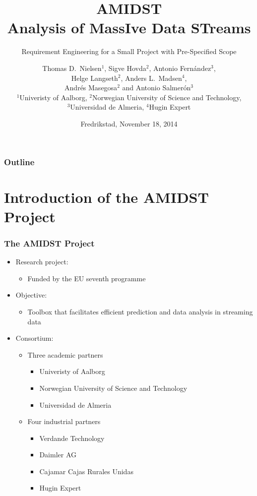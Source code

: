 \documentclass{beamer}
\title{AMIDST \\ \Large \textcolor{orange!60}{Analysis} 
				   \textcolor{blue!50!cyan!80}{of MassIve} 
				   \textcolor{olive!5!green!90}{Data STreams}}
\subtitle{Requirement Engineering for a Small Project with Pre-Specified Scope}
\author{{\scriptsize Thomas D.\ Nielsen$^{1}$, Sigve Hovda$^{2}$, Antonio Fern\'andez$^{3}$, \\ Helge Langseth$^{2}$, 
Anders L.\ Madsen$^{4}$, \\Andr\'es Masegosa$^{2}$ and  Antonio Salmer\'on$^{3}$ \\
 $^{1}$Univeristy of Aalborg, $^{2}$Norwegian University of Science and Technology, 
\\
 $^{3}$Universidad de Almeria, $^{4}$Hugin Expert}}
\date{Fredrikstad, November 18, 2014}
\begin{document}
\begin{frame}\frametitle{}
\titlepage
\end{frame}

\begin{frame}\frametitle{Outline}
\vspace{-1cm}
\tableofcontents
\end{frame}

\section{Introduction of the AMIDST Project}


\begin{frame} \frametitle{The AMIDST Project} 
\vspace{-1cm}

\begin{itemize}
\item<1-> Research project:
\begin{itemize}
\item<1-> Funded by the EU seventh programme
\end{itemize}
\item<2-> Objective: 
\begin{itemize}
\item<2-> Toolbox that facilitates efficient prediction and data analysis in streaming data
\end{itemize}
\item<3-> Consortium:
\begin{itemize}
\item<3-> Three academic partners
\begin{itemize}
\item<3-> Univeristy of Aalborg
\item<3-> Norwegian University of Science and Technology
\item<3-> Universidad de Almeria
\end{itemize}
\item<4-> Four industrial partners
\begin{itemize}
\item<4-> Verdande Technology
\item<4-> Daimler AG
\item<4-> Cajamar Cajas Rurales Unidas
\item<4-> Hugin Expert
\end{itemize}
\end{itemize}
\end{itemize}

\end{frame}
\end{document}
